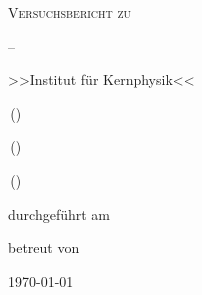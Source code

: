 
\makeatletter
\newcommand*{\protokollemailparse}[1]{%
	\@for\@tempa:=#1\do{%
		\normalsize\email{\@tempa}\\
	}%
}
\makeatother

\begin{titlepage}
	\centering
	{\scshape\LARGE Versuchsbericht zu \par}
	\vspace{1cm}
	{\scshape\huge \varNum {} -- \varName\par}
	{\Large >>Institut für Kernphysik<<\par}
	\vspace{2.5cm}
	{\LARGE \varGruppe\par}
	\vspace{0.5cm}
	{\large \varNameA \,(\email{\varEmailA}) \par}
	{\large \varNameB \,(\email{\varEmailB}) \par}
	{\large \varNameC \,(\email{\varEmailC}) \par}
	\vfill
	durchgeführt am {\large \varDatum}\par
	betreut von {\large \varBetreuer} 
	\vfill	
	{\large \today\par}
\end{titlepage}


\maketitle
